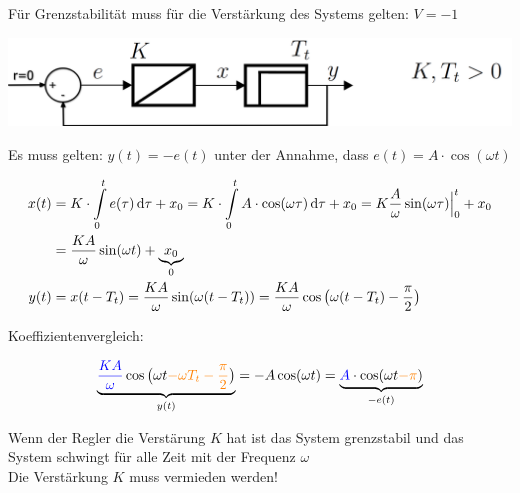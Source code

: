     Für Grenzstabilität muss für die Verstärkung des Systems gelten: $V = -1$ 



    \begin{center}
        \includegraphics[align=center, width=0.75\columnwidth]{images/gegengekoppeltes_system.png}
    \end{center}

    Es muss gelten: $y(t) = -e(t)$ unter der Annahme, dass $e(t) = A \cdot \cos(\omega t)$

    \vspace*{-0.3cm}        %

    \begin{align*}
        x(t) &= K \cdot \int\limits_0^t e(\tau) \mathop{} \! \mathrm{d} \tau + x_0 
            = K \cdot \int\limits_0^t A \cdot \cos(\omega \tau) \mathop{} \! \mathrm{d} \tau + x_0
            = K \frac{A}{\omega} \sin(\omega \tau) \Big|_0^t + x_0 \\
            &= \frac{K A}{\omega} \sin(\omega t) + \underbrace{x_0}_{0} \\
        y(t) &= x(t - T_t) = \frac{K A}{\omega} \sin(\omega (t - T_t)) = \frac{K A}{\omega} \cos \big( \omega( t- T_t) - \frac{\pi}{2}  \big)
    \end{align*}

    Koeffizientenvergleich: 

    $$ \underbrace{ {\color{blue} \frac{K A}{\omega}} \cos \big( \omega t {\color{orange}- \omega T_t - \frac{\pi}{2}}  \big) }_{y(t)}
         = - A \cos(\omega t) = \underbrace{ {\color{blue}A} \cdot \cos(\omega t {\color{orange}- \pi}) }_{-e(t)} $$
    
    \textrightarrow Wenn der Regler die Verstärung $K$ hat ist das System grenzstabil 
    und das System schwingt für alle Zeit mit der Frequenz $\omega$\\
    \textrightarrow Die Verstärkung $K$ muss vermieden werden!
